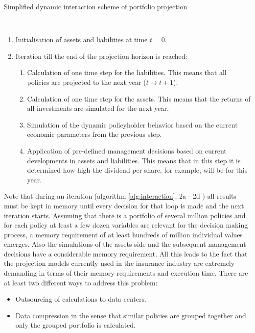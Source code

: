 \begin{algorithm}
	\caption{Simplified dynamic interaction scheme of portfolio projection}\label{alg:interaction}
	\begin{algorithmic}
		\\
		\begin{enumerate}
			\item Initialisation of assets and liabilities at time $t = 0$.
			\item  Iteration till the end of the projection horizon is reached:
			\begin{enumerate}[label=\emph{\alph*})]
				\item Calculation of one time step for the liabilities. This means that all policies are projected to the next year ($t \mapsto t+1$). 
				\item Calculation of one time step for the assets. This means that the returns of all investments are simulated for the next year.
				\item Simulation of the dynamic policyholder behavior based on the current economic parameters from the previous step.
				\item Application of pre-defined management decisions based on current developments in assets and liabilities. This means that in this step it is determined how high the dividend per share, for example, will be for this year. 
			\end{enumerate}
		\end{enumerate}
	\end{algorithmic}
\end{algorithm}

Note that during an iteration (algorithm \ref{alg:interaction}, 2a - 2d ) all results must be kept in memory until every decision for that loop is made and the next iteration starts. Assuming that there is a portfolio of several million policies and for each policy at least a few dozen variables are relevant for the decision making process, a memory requirement of at least hundreds of million individual values emerges. Also the simulations of the assets side and the subsequent management decisions have a considerable memory requirement. All this leads to the fact that the projection models currently used in the insurance industry are extremely demanding in terms of their memory requirements and execution time. There are at least two different ways to address this problem:

\begin{itemize}
	\item Outsourcing of calculations to data centers.
	\item Data compression in the sense that similar policies are grouped together and only the grouped portfolio is calculated.
\end{itemize}

